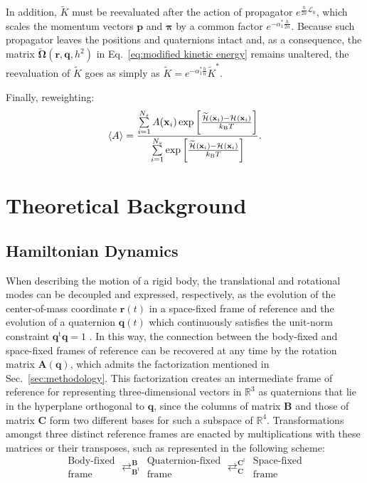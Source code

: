 \documentclass[
journal=jctcce,
layout=twocolumn
]{achemso}
\newcommand{\mt}[1]{\boldsymbol{\mathbf{#1}}}   %
\newcommand{\vt}[1]{\boldsymbol{\mathbf{#1}}}   %
\newcommand{\tr}[1]{#1^\text{t}}                %
\newcommand{\Ham}[1]{{\mathcal H}_\text{#1}}    %
\newcommand{\timestep}{h}
\newcommand{\modified}[1]{\widetilde{#1}}
\begin{document}
In addition, $\modified K$ must be reevaluated after the action of propagator $e^{\frac{\timestep}{2n} {\mathcal L}_0}$, which scales the momentum vectors $\vt p$ and $\vt \pi$ by a common factor $e^{-\alpha_1^\ast \frac{\timestep}{2n}}$. Because such propagator leaves the positions and quaternions intact and, as a consequence, the matrix $\modified{\mathbf \Omega}(\vt r, \vt q, \timestep^2)$ in Eq.~\eqref{eq:modified kinetic energy} remains unaltered, the reevaluation of $\modified K$ goes as simply as ${\modified K} = e^{-\alpha_1^\ast \frac{\timestep}{n}} {\modified K}^\ast$.

Finally, reweighting:
\begin{equation}
\label{eq:reweighting}
\langle A \rangle = \frac{\sum\limits_{i=1}^{N_s} A(\vt x_i) \exp \left[{\frac{\modified{\Ham{}}(\vt x_i) - {\Ham{}}(\vt x_i)}{k_\text{\tiny B} T}}\right]}{\sum\limits_{i=1}^{N_s} \exp \left[{\frac{\modified{\Ham{}}(\vt x_i) - {\Ham{}}(\vt x_i)}{k_\text{\tiny B} T}}\right] }.
\end{equation}

\section{Theoretical Background}
\label{sec:theory}

\subsection{Hamiltonian Dynamics}
\label{eq:hamiltonian dynamics}

When describing the motion of a rigid body, the translational and rotational modes can be decoupled and expressed, respectively, as the evolution of the center-of-mass coordinate $\vt r(t)$ in a space-fixed frame of reference and the evolution of a quaternion $\vt q(t)$ which continuously satisfies the unit-norm constraint $\tr{\vt q}{\vt q} = 1$ \cite{Goldstein_2002}. In this way, the connection between the body-fixed and space-fixed frames of reference can be recovered at any time by the rotation matrix $\mt A(\vt q)$, which admits the factorization mentioned in Sec.~\ref{sec:methodology}. This factorization creates an intermediate frame of reference for representing three-dimensional vectors in $\mathbb{R}^3$ as quaternions that lie in the hyperplane orthogonal to $\vt q$, since the columns of matrix $\mt B$ and those of matrix $\mt C$ form two different bases for such a subspace of $\mathbb{R}^4$. Transformations amongst three distinct reference frames are enacted by multiplications with these matrices or their transposes, such as represented in the following scheme:
\begin{equation*}
\boxed{\substack{\text{Body-fixed} \\ \text{frame}}}
\mathrel{\mathop{\rightleftarrows}^{\mt B}_{\tr{\mt B}}}
\boxed{\substack{\text{Quaternion-fixed} \\ \text{frame}}}
\mathrel{\mathop{\rightleftarrows}^{\tr{\mt C}}_{\mt C}}
\boxed{\substack{\text{Space-fixed} \\ \text{frame}}}
\end{equation*}
\end{document}
